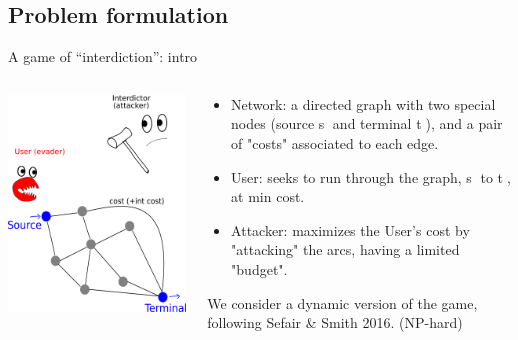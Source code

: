 \documentclass[10pt, xcolor=svgnames]{beamer}
\begin{document}
\subsection{Problem formulation}
\label{sec:orgfe362f1}
\begin{frame}[label={sec:org320a9fd}]{A game of ``interdiction'': intro}
\begin{columns}
\begin{column}[t]{0.4\columnwidth}
\begin{center}
\includegraphics[width=.9\linewidth]{./img/SPI.png}
\end{center}
\end{column}

\begin{column}[t]{0.6\columnwidth}
\begin{itemize}
\item \alert{Network:} a directed graph with two special nodes (source \textcircled{s} and terminal \textcircled{t}), and a pair of "costs" associated to each edge.
\item \alert{User:} seeks to run through the graph, \textcircled{s} to \textcircled{t}, at min cost.
\item \alert{Attacker:} maximizes the User's cost by "attacking" the arcs, having a limited "budget".
\end{itemize}

We consider a \alert{dynamic} version of the game, following Sefair \& Smith 2016. (NP-hard)
\end{column}
\end{columns}
\end{frame}
\end{document}
